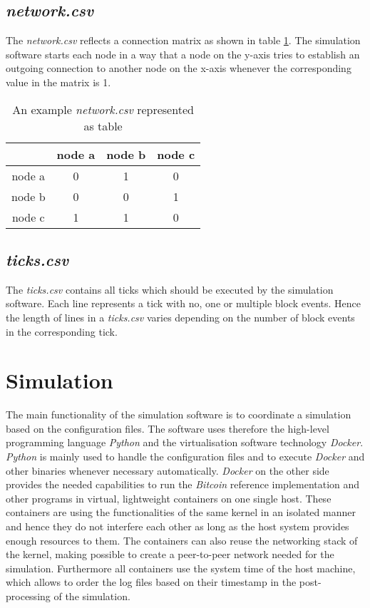 \subsection{\textit{network.csv}}
The \textit{network.csv} reflects a connection matrix as shown in table \ref{tab:network_csv}.
The simulation software starts each node in a way that a node on the y-axis tries to establish an outgoing connection to another node on the x-axis whenever the corresponding value in the matrix is 1.

\begin{table}
  \centering
  \begin{tabular}{c|ccc}
    			& node a 	& node b	& node c	\\
    \hline
    node a		& 0			& 1         & 0         \\
    node b      & 0         & 0         & 1			\\
    node c      & 1         & 1			& 0         \\
  \end{tabular}
  \caption{An example \textit{network.csv} represented as table}
  \label{tab:network_csv}
\end{table}

\subsection{\textit{ticks.csv}}

The \textit{ticks.csv} contains all ticks which should be executed by the simulation software.
Each line represents a tick with no, one or multiple block events.
Hence the length of lines in a \textit{ticks.csv} varies depending on the number of block events in the corresponding tick.

\section{Simulation}
\label{chap:simulation}

The main functionality of the simulation software is to coordinate a simulation based on the configuration files.
The software uses therefore the high-level programming language \textit{Python} and the virtualisation software technology \textit{Docker}.
\textit{Python} is mainly used to handle the configuration files and to execute \textit{Docker} and other binaries whenever necessary automatically.
\textit{Docker} on the other side provides the needed capabilities to run the \textit{Bitcoin} reference implementation and other programs in virtual, lightweight containers on one single host.
These containers are using the functionalities of the same kernel in an isolated manner and hence they do not interfere each other as long as the host system provides enough resources to them.
The containers can also reuse the networking stack of the kernel, making possible to create a peer-to-peer network needed for the simulation.
Furthermore all containers use the system time of the host machine, which allows to order the log files based on their timestamp in the post-processing of the simulation.
	
